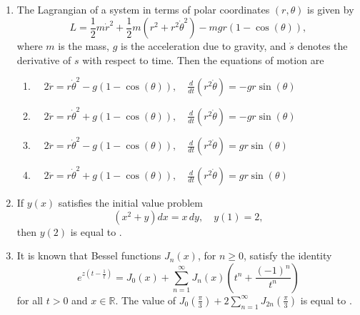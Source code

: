 \documentclass[journal]{IEEEtran}
\numberwithin{equation}{enumi}
\numberwithin{figure}{enumi}
\begin{document}
\begin{enumerate}
    \bigskip

    \item The Lagrangian of a system in terms of polar coordinates $(r, \theta)$ is given by
    \[
    L = \frac{1}{2} m \dot{r}^2 + \frac{1}{2} m \left( r^2 + r^2 \dot{\theta}^2 \right) - m g r \left( 1 - \cos(\theta) \right),
    \]
    where $m$ is the mass, $g$ is the acceleration due to gravity, and $\dot{s}$ denotes the derivative of $s$ with respect to time. Then the equations of motion are
    \begin{enumerate}
        \item $ \quad 2 \ddot{r} = r \dot{\theta}^2 - g \left( 1 - \cos(\theta) \right), \quad \frac{d}{dt} \left( r^2 \dot{\theta} \right) = - g r \sin(\theta)$
        \item $ \quad 2 \ddot{r} = r \dot{\theta}^2 + g \left( 1 - \cos(\theta) \right), \quad \frac{d}{dt} \left( r^2 \dot{\theta} \right) = - g r \sin(\theta)$
        \item $ \quad 2 \ddot{r} = r \dot{\theta}^2 - g \left( 1 - \cos(\theta) \right), \quad \frac{d}{dt} \left( r^2 \dot{\theta} \right) = g r \sin(\theta)$
        \item $ \quad 2 \ddot{r} = r \dot{\theta}^2 + g \left( 1 - \cos(\theta) \right), \quad \frac{d}{dt} \left( r^2 \dot{\theta} \right) = g r \sin(\theta)$
    \end{enumerate}

    \bigskip

    \item If $y(x)$ satisfies the initial value problem 
    \[
    (x^2 + y) dx = x \, dy, \quad y(1) = 2,
    \]
    then $y(2)$ is equal to \underline{\hspace{1cm}}.
    
    \bigskip

    \item It is known that Bessel functions $J_n(x)$, for $n \geq 0$, satisfy the identity
    \[
    e^{z \left( t - \frac{1}{t} \right)} = J_0(x) + \sum_{n=1}^\infty J_n(x) \left( t^n + \frac{(-1)^n}{t^n} \right)
    \]
    for all $t > 0$ and $x \in \mathbb{R}$. The value of $J_0 \left( \frac{\pi}{3} \right) + 2 \sum_{n=1}^\infty J_{2n} \left( \frac{\pi}{3} \right)$ is equal to \underline{\hspace{1cm}}.
    
    \bigskip


\end{enumerate}
\end{document}
